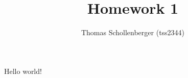 \documentclass{article}
\title{Homework 1}
\author{Thomas Schollenberger (tss2344)}
\begin{document}
    Hello world!
\end{document}
